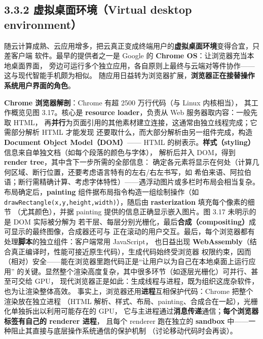 \begin{closeread}
\end{closeread}


\subsection*{3.3.2 虚拟桌面环境（Virtual desktop environment）}
随云计算成熟、云应用增多，把云真正变成终端用户的\textbf{虚拟桌面环境}变得合宜，只差客户端
软件。最早的提供者之一是 Google 的 \textbf{Chrome OS}：让浏览器充当本地桌面界面，
旁边可运行多个独立应用，各自原则上最终与云端对等件协作——这与现代智能手机颇为相似。
随应用日益转为浏览器扩展，\textbf{浏览器正在接替操作系统用户界面的角色}。

\medskip\noindent\textbf{Chrome 浏览器解剖}：Chrome 有超 2500 万行代码（与 Linux 内核相当），
其工作概览见图 3.17。核心是 \textbf{resource loader}，负责从 Web 服务器取内容：一般先取 HTML，
再\textbf{并行}为页面引用的其他素材建立连接，这通常由独立线程完成；它需部分解析 HTML 才能发现
还要取什么，而大部分解析由另一组件完成，构造 \textbf{Document Object Model（DOM）}——
HTML 的树表示。\textbf{样式（styling）}信息来自单独文档（如每个段落的颜色与字体），
解析后并入 DOM，得到 \textbf{render tree}，其中含下一步所需的全部信息：
确定各元素将显示在何处（计算几何区域、断行位置，还要考虑语言特有的左右/右左书写，如
希伯来语、阿拉伯语；断行需精确计算、考虑字体特性）——遇浮动图片或多栏时布局会相当复杂。
布局确定后，\textbf{painting} 组件据布局指令构造一组绘制操作（如
\texttt{drawRectangle(x,y,height,width)}），随后由 \textbf{rasterization} 填充每个像素的细节
（尤其颜色），并据 painting 提供的信息正确显示嵌入图片。图 3.17 未明示的是 DOM 实际被分解为
若干层、每层分别光栅化，最后\textbf{合成（compositing）}成可显示的最终图像，合成器还可与
正在滚动的用户交互。最后，每个浏览器都有处理\textbf{脚本}的独立组件：客户端常用 JavaScript，
也日益出现 \textbf{WebAssembly}（结合真正编译时，性能可接近原生代码），生成代码始终受浏览器
权限约束，因而（相对）安全——能在浏览器里跑代码正是“让用户以为自己在本地桌面上运行应用”
的关键。显然整个渲染高度复杂，其中很多环节（如逐层光栅化）可并行、甚至可交给 GPU，
现代浏览器正是如此：生成线程与进程，既为组织这庞杂软件，也为让渲染整体高效。
事实上，浏览器还用\textbf{进程}互相保护代码：Chrome 把整个渲染放在独立进程
（HTML 解析、样式、布局、painting、合成合在一起），光栅化单独拆出以利用可能存在的 GPU，
它与主进程通过\textbf{消息传递}通信；\textbf{每个浏览器标签有自己的 renderer 进程}，
且每个 renderer 跑在独立的 \textbf{sandbox} 中——一种阻止其直接与底层操作系统通信的保护机制
（讨论移动代码时会再谈）。

